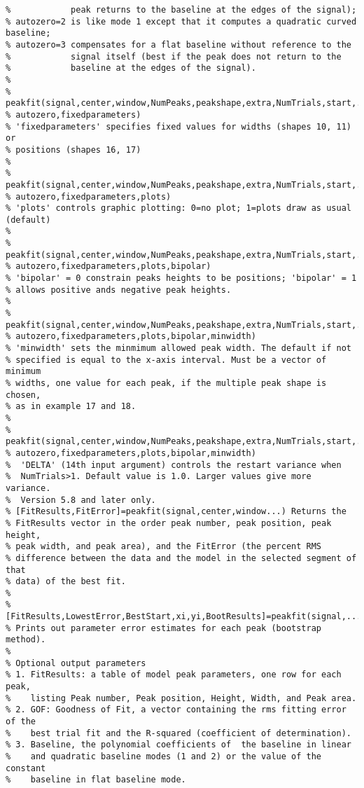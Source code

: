 \begin{lstlisting}
%            peak returns to the baseline at the edges of the signal); 
% autozero=2 is like mode 1 except that it computes a quadratic curved baseline; 
% autozero=3 compensates for a flat baseline without reference to the 
%            signal itself (best if the peak does not return to the
%            baseline at the edges of the signal).
%
% peakfit(signal,center,window,NumPeaks,peakshape,extra,NumTrials,start,...
% autozero,fixedparameters)
% 'fixedparameters' specifies fixed values for widths (shapes 10, 11) or
% positions (shapes 16, 17)
% 
% peakfit(signal,center,window,NumPeaks,peakshape,extra,NumTrials,start,...
% autozero,fixedparameters,plots)
% 'plots' controls graphic plotting: 0=no plot; 1=plots draw as usual (default)
% 
% peakfit(signal,center,window,NumPeaks,peakshape,extra,NumTrials,start,...
% autozero,fixedparameters,plots,bipolar)
% 'bipolar' = 0 constrain peaks heights to be positions; 'bipolar' = 1
% allows positive ands negative peak heights.
%
% peakfit(signal,center,window,NumPeaks,peakshape,extra,NumTrials,start,...
% autozero,fixedparameters,plots,bipolar,minwidth)
% 'minwidth' sets the minmimum allowed peak width. The default if not
% specified is equal to the x-axis interval. Must be a vector of minimum
% widths, one value for each peak, if the multiple peak shape is chosen, 
% as in example 17 and 18.
%
% peakfit(signal,center,window,NumPeaks,peakshape,extra,NumTrials,start,...
% autozero,fixedparameters,plots,bipolar,minwidth)
%  'DELTA' (14th input argument) controls the restart variance when
%  NumTrials>1. Default value is 1.0. Larger values give more variance.
%  Version 5.8 and later only. 
% [FitResults,FitError]=peakfit(signal,center,window...) Returns the
% FitResults vector in the order peak number, peak position, peak height,
% peak width, and peak area), and the FitError (the percent RMS
% difference between the data and the model in the selected segment of that
% data) of the best fit.
%
% [FitResults,LowestError,BestStart,xi,yi,BootResults]=peakfit(signal,...)
% Prints out parameter error estimates for each peak (bootstrap method).
%
% Optional output parameters 
% 1. FitResults: a table of model peak parameters, one row for each peak,
%    listing Peak number, Peak position, Height, Width, and Peak area.
% 2. GOF: Goodness of Fit, a vector containing the rms fitting error of the
%    best trial fit and the R-squared (coefficient of determination).
% 3. Baseline, the polynomial coefficients of  the baseline in linear
%    and quadratic baseline modes (1 and 2) or the value of the constant
%    baseline in flat baseline mode.

\end{lstlisting}
